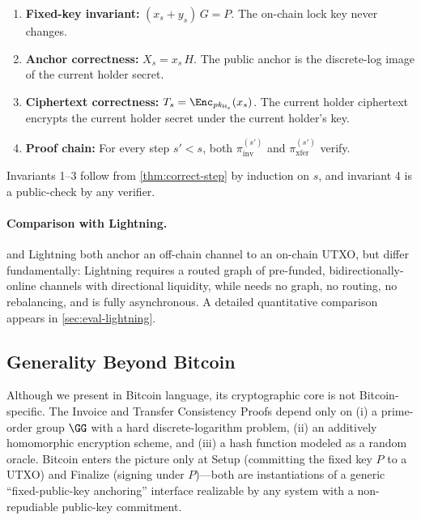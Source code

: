 \begin{enumerate}
  \item \textbf{Fixed-key invariant:} $(x_s + y_s)\,G = P$. The on-chain lock key never changes.
  \item \textbf{Anchor correctness:} $X_s = x_s\,H$. The public anchor is the discrete-log image of the current holder secret.
  \item \textbf{Ciphertext correctness:} $T_s = \Enc_{pk_{\mathsf{H}_s}}(x_s)$. The current holder ciphertext encrypts the current holder secret under the current holder's key.
  \item \textbf{Proof chain:} For every step $s' < s$, both $\pi^{(s')}_{\mathrm{inv}}$ and $\pi^{(s')}_{\mathrm{xfer}}$ verify.
\end{enumerate}

Invariants 1--3 follow from \autoref{thm:correct-step} by induction on $s$, and invariant 4 is a public-check by any verifier.

\paragraph{Comparison with Lightning.}
\thunderbolt and Lightning both anchor an off-chain channel to an on-chain UTXO, but differ fundamentally: Lightning requires a routed graph of pre-funded, bidirectionally-online channels with directional liquidity, while \thunderbolt needs no graph, no routing, no rebalancing, and is fully asynchronous. A detailed quantitative comparison appears in \autoref{sec:eval-lightning}.

\subsection{Generality Beyond Bitcoin}\label{sec:generality}

Although we present \thunderbolt in Bitcoin language, its cryptographic core is not Bitcoin-specific. The Invoice and Transfer Consistency Proofs depend only on (i) a prime-order group $\GG$ with a hard discrete-logarithm problem, (ii) an additively homomorphic encryption scheme, and (iii) a hash function modeled as a random oracle. Bitcoin enters the picture only at \textsf{Setup} (committing the fixed key $P$ to a UTXO) and \textsf{Finalize} (signing under $P$)---both are instantiations of a generic ``fixed-public-key anchoring'' interface realizable by any system with a non-repudiable public-key commitment.

